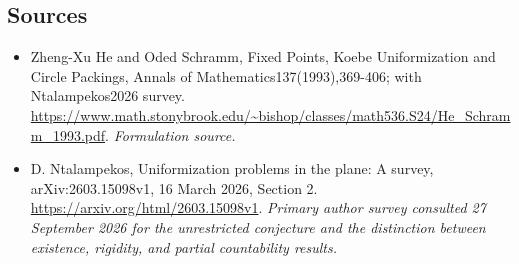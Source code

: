 \documentclass[11pt]{article}
\begin{document}
\subsection{Sources}
\begin{itemize}
\item[S1]Zheng-Xu He and Oded Schramm, Fixed Points, Koebe Uniformization and Circle Packings, Annals of Mathematics137(1993),369-406; with Ntalampekos2026 survey.
\url{https://www.math.stonybrook.edu/~bishop/classes/math536.S24/He_Schramm_1993.pdf}.
\textit{Formulation source.}
\item[E1]D. Ntalampekos, Uniformization problems in the plane: A survey, arXiv:2603.15098v1, 16 March 2026, Section 2.
\url{https://arxiv.org/html/2603.15098v1}.
\textit{Primary author survey consulted 27 September 2026 for the unrestricted conjecture and the distinction between existence, rigidity, and partial countability results.}
\end{itemize}
\end{document}

